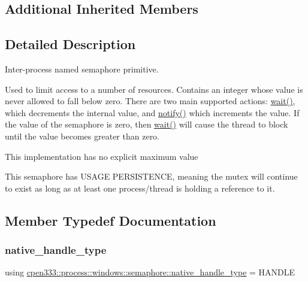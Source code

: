 \subsection*{Additional Inherited Members}


\subsection{Detailed Description}
Inter-\/process named semaphore primitive. 

Used to limit access to a number of resources. Contains an integer whose value is never allowed to fall below zero. There are two main supported actions\+: \hyperlink{classcpen333_1_1process_1_1windows_1_1semaphore_a523d89b784ed47ade79d4ecf836f042d}{wait()}, which decrements the internal value, and \hyperlink{classcpen333_1_1process_1_1windows_1_1semaphore_a7f1443d55e1112e7b2a15334bafc958b}{notify()} which increments the value. If the value of the semaphore is zero, then \hyperlink{classcpen333_1_1process_1_1windows_1_1semaphore_a523d89b784ed47ade79d4ecf836f042d}{wait()} will cause the thread to block until the value becomes greater than zero.

This implementation has no explicit maximum value

This semaphore has U\+S\+A\+GE P\+E\+R\+S\+I\+S\+T\+E\+N\+CE, meaning the mutex will continue to exist as long as at least one process/thread is holding a reference to it. 

\subsection{Member Typedef Documentation}
\mbox{\label{classcpen333_1_1process_1_1windows_1_1semaphore_aa3e5433587a4f60fc2984eb3509946c9}} 
\subsubsection{\texorpdfstring{native\+\_\+handle\+\_\+type}{native\_handle\_type}}
{\footnotesize\ttfamily using \hyperlink{classcpen333_1_1process_1_1posix_1_1semaphore_ad63150e5c8c196a84a7b214462756f1a}{cpen333\+::process\+::windows\+::semaphore\+::native\+\_\+handle\+\_\+type} =  H\+A\+N\+D\+LE}



